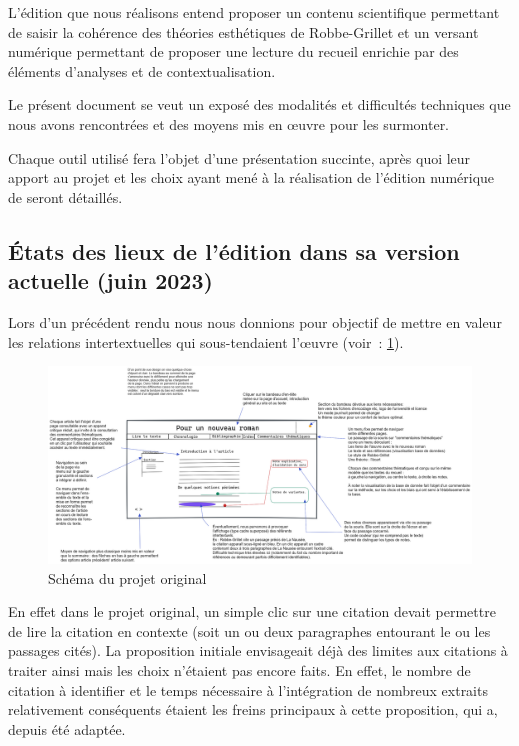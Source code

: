 \documentclass[12pt, a4paper]{article}
\begin{document}
L'édition que nous réalisons entend proposer un contenu scientifique permettant de saisir la cohérence des théories esthétiques de Robbe-Grillet et un versant numérique permettant de proposer une lecture du recueil enrichie par des éléments d'analyses et de contextualisation.





Le présent document se veut un exposé des modalités et difficultés techniques que nous avons rencontrées et des moyens mis en œuvre pour les surmonter.

Chaque outil utilisé fera l'objet d'une présentation succinte, après quoi leur apport au projet et les choix ayant mené à la réalisation de l'édition numérique de \punr{} seront détaillés.



\subsection{États des lieux de l'édition dans sa version actuelle (juin 2023)}

Lors d'un précédent rendu nous nous donnions pour objectif de mettre en valeur les relations intertextuelles qui sous-tendaient l'œuvre (voir~: \ref{fig:projet}).

\begin{figure}[H]
    \centering
    \includegraphics[scale=0.3]{img/202211_mevel_punr_edition_numerique.png}
    \caption{Schéma du projet original}
    \label{fig:projet}
\end{figure}



En effet dans le projet original, un simple clic sur une citation devait permettre de lire la citation en contexte (soit un ou deux paragraphes entourant le ou les passages cités). La proposition initiale envisageait déjà des limites aux citations à traiter ainsi mais les choix n'étaient pas encore faits. En effet, le nombre de citation à identifier et le temps nécessaire à l'intégration de nombreux extraits relativement conséquents étaient les freins principaux à cette proposition, qui a, depuis été adaptée.
\end{document}
